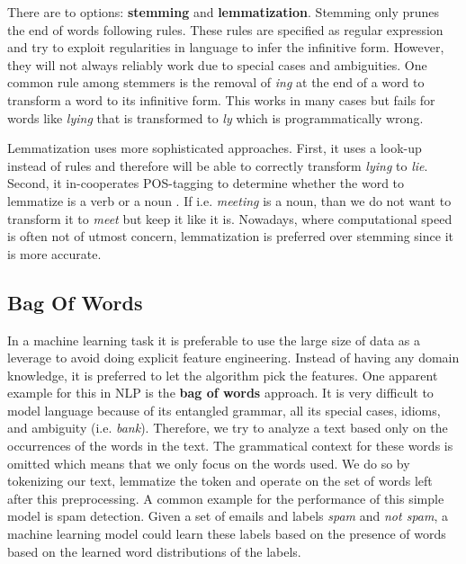 There are to options: \textbf{stemming} and \textbf{lemmatization}. Stemming only prunes the end of words following rules. These rules are specified as regular expression and try to exploit regularities in language to infer the infinitive form. However, they will not always reliably work due to special cases and ambiguities. One common rule among stemmers is the removal of \textit{ing} at the end of a word to transform a word to its infinitive form. This works in many cases but fails for words like \textit{lying} that is transformed to \textit{ly} which is programmatically wrong.

Lemmatization uses more sophisticated approaches. First, it uses a look-up instead of rules and therefore will be able to correctly transform \textit{lying} to \textit{lie}. Second, it in-cooperates POS-tagging to determine whether the word to lemmatize is a verb or a noun \citep{Muller2015}. If i.e. \textit{meeting} is a noun, than we do not want to transform it to \textit{meet} but keep it like it is. Nowadays, where computational speed is often not of utmost concern, lemmatization is preferred over stemming since it is more accurate\citep{Balakrishnan2014}.


\subsection{Bag Of Words}
In a machine learning task it is preferable to use the large size of data as a leverage to avoid doing explicit feature engineering. Instead of having any domain knowledge, it is preferred to let the algorithm pick the features. One apparent example for this in NLP is the \textbf{bag of words} approach. It is very difficult to model language because of its entangled grammar, all its special cases, idioms, and ambiguity (i.e. \textit{bank}). Therefore, we try to analyze a text based only on the occurrences of the words in the text. The grammatical context for these words is omitted which means that we only focus on the words used. We do so by tokenizing our text, lemmatize the token and operate on the set of words left after this preprocessing. A common example for the performance of this simple model is spam detection. Given a set of emails and labels \emph{spam} and \emph{not spam}, a machine learning model could learn these labels based on the presence of words based on the learned word distributions of the labels.

